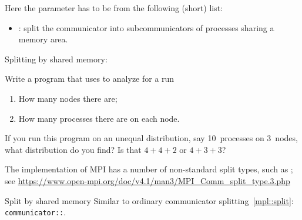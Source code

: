 Here the  parameter has to be from the following (short) list:
\begin{itemize}
\item {}: split the communicator into subcommunicators
  of processes sharing a memory area.
\end{itemize}

Splitting by shared memory:
%

\begin{exercise}
  Write a program that uses 
  to  analyze for a run
  \begin{enumerate}
  \item How many nodes there are;
  \item How many processes there are on each node.
  \end{enumerate}
  If you run this program on an unequal distribution,
  say 10~processes on 3~nodes, what distribution do you find?
  Is that $4+4+2$ or $4+3+3$?
\end{exercise}

\begin{remark}
  The  implementation of MPI has a number of
  non-standard split types, such as ;
  see \url{https://www.open-mpi.org/doc/v4.1/man3/MPI_Comm_split_type.3.php}
\end{remark}

\begin{mplnote}{Split by shared memory}
  Similar to ordinary communicator splitting~\ref{mpl::split}:
  \lstinline+communicator::+.
\end{mplnote}

